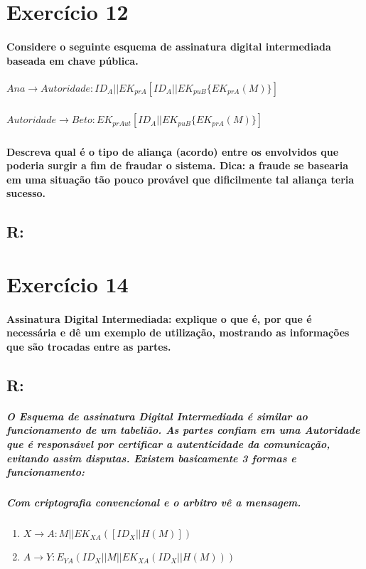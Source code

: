 \documentclass[10pt,a4paper]{report}
\begin{document}
\section*{Exercício 12}
\paragraph{Considere o seguinte esquema de assinatura digital intermediada baseada em chave pública.} 
\subparagraph{$Ana \rightarrow Autoridade: ID_A || EK_{prA} [ ID_A || EK_{puB} \{ EK_{prA} ( M ) \} ]$}
\subparagraph{$Autoridade \rightarrow Beto:  EK_{prAut} [ ID_A || EK_{puB} \{ EK_{prA} ( M ) \} ]$}
\paragraph{Descreva qual é o tipo de aliança (acordo) entre os envolvidos que poderia surgir a fim de fraudar o sistema. Dica: a fraude se basearia em uma situação tão pouco provável que dificilmente tal aliança teria sucesso.}
\subsection*{R:}

\section*{Exercício 14}
\paragraph{Assinatura Digital Intermediada: explique o que é, por que é necessária e dê um exemplo de utilização, mostrando as informações que são trocadas entre as partes.}
\subsection*{R:}
\subparagraph{O Esquema de assinatura Digital Intermediada é similar ao funcionamento de um tabelião. As partes confiam em uma Autoridade que é responsável por certificar a autenticidade da comunicação, evitando assim disputas. Existem basicamente 3 formas e funcionamento:}
\subparagraph{Com criptografia convencional e o arbitro vê a mensagem. }
\begin{enumerate}
\item $X \rightarrow A: M||EK_{XA}([ID_X||H(M)])$
\item $A \rightarrow Y: E_{YA}(ID_X||M||EK_{XA}(ID_X||H(M))) $
\end{enumerate}
\end{document}
